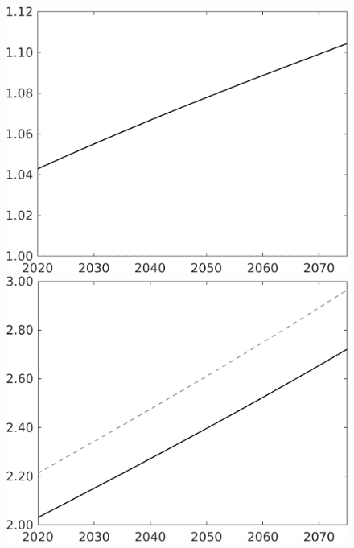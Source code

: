 \documentclass[12pt]{article}
\begin{document}
\begin{figure}[h!!]
\begin{minipage}[]{0.32\textwidth}
\end{minipage}	
	\begin{minipage}[]{0.32\textwidth}
		\includegraphics[width=1\textwidth]{../../codding_model/own_basedOnFried/optimalPol_010922_revision/figures/all_13Sept22/CompTaul_LFBAU_Reg0_lambdaa_spillover0_nsk1_xgr1_knspil1_sep1_countec0_GovRev0_etaa0.79_lgd0.png}
	\end{minipage}	
	\begin{minipage}[]{0.32\textwidth}
		\includegraphics[width=1\textwidth]{../../codding_model/own_basedOnFried/optimalPol_010922_revision/figures/all_13Sept22/CompTaul_LFBAU_Reg0_Y_spillover0_nsk1_xgr1_knspil1_sep1_countec0_GovRev0_etaa0.79_lgd0.png}

\end{minipage}
\end{figure}
\end{document}
